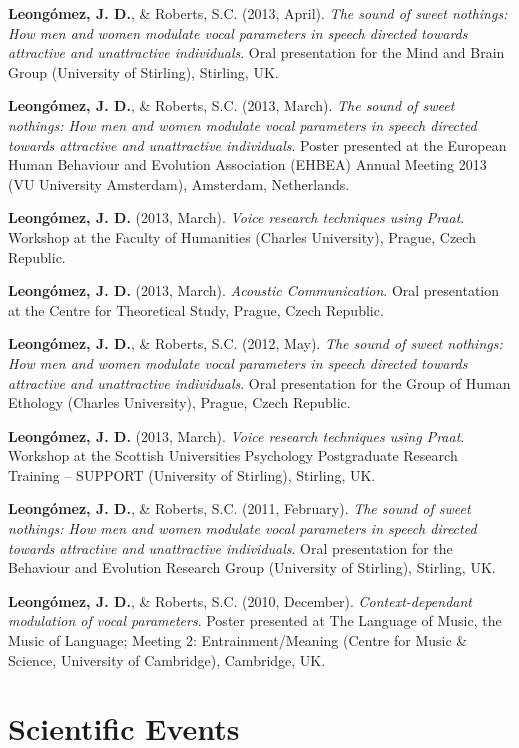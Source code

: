 \documentclass[11pt,a4paper,]{awesome-cv}
\begin{document}
\textbf{Leongómez, J. D.}, \& Roberts, S.C. (2013, April). \emph{The
sound of sweet nothings: How men and women modulate vocal parameters in
speech directed towards attractive and unattractive individuals}. Oral
presentation for the Mind and Brain Group (University of Stirling),
Stirling, UK.

\textbf{Leongómez, J. D.}, \& Roberts, S.C. (2013, March). \emph{The
sound of sweet nothings: How men and women modulate vocal parameters in
speech directed towards attractive and unattractive individuals}. Poster
presented at the European Human Behaviour and Evolution Association
(EHBEA) Annual Meeting 2013 (VU University Amsterdam), Amsterdam,
Netherlands.

\textbf{Leongómez, J. D.} (2013, March). \emph{Voice research techniques
using Praat}. Workshop at the Faculty of Humanities (Charles
University), Prague, Czech Republic.

\textbf{Leongómez, J. D.} (2013, March). \emph{Acoustic Communication}.
Oral presentation at the Centre for Theoretical Study, Prague, Czech
Republic.

\textbf{Leongómez, J. D.}, \& Roberts, S.C. (2012, May). \emph{The sound
of sweet nothings: How men and women modulate vocal parameters in speech
directed towards attractive and unattractive individuals}. Oral
presentation for the Group of Human Ethology (Charles University),
Prague, Czech Republic.

\textbf{Leongómez, J. D.} (2013, March). \emph{Voice research techniques
using Praat}. Workshop at the Scottish Universities Psychology
Postgraduate Research Training -- SUPPORT (University of Stirling),
Stirling, UK.

\textbf{Leongómez, J. D.}, \& Roberts, S.C. (2011, February). \emph{The
sound of sweet nothings: How men and women modulate vocal parameters in
speech directed towards attractive and unattractive individuals}. Oral
presentation for the Behaviour and Evolution Research Group (University
of Stirling), Stirling, UK.

\textbf{Leongómez, J. D.}, \& Roberts, S.C. (2010, December).
\emph{Context-dependant modulation of vocal parameters}. Poster
presented at The Language of Music, the Music of Language; Meeting 2:
Entrainment/Meaning (Centre for Music \& Science, University of
Cambridge), Cambridge, UK.

\endgroup

\hypertarget{scientific-events}{%
\section{Scientific Events}\label{scientific-events}}
\end{document}
